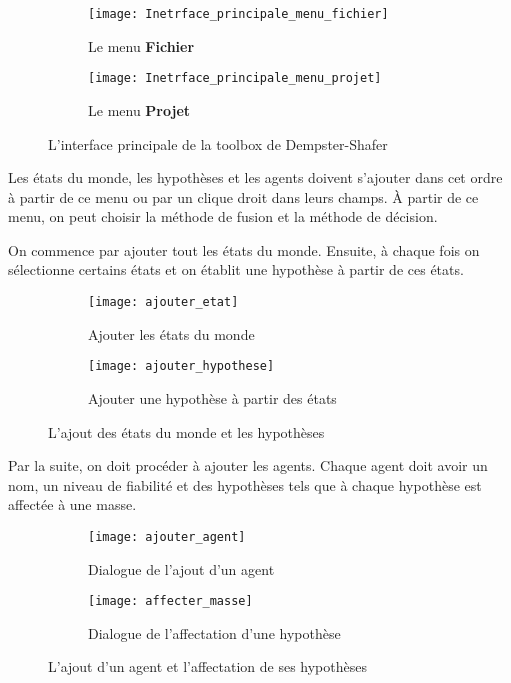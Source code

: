 \begin{figure}[H]
\begin{subfigure}{0.49\textwidth}
\texttt{[image: Inetrface\_principale\_menu\_fichier]}
\caption{Le menu \textbf{Fichier}}
\end{subfigure}
\hfill
\begin{subfigure}{0.49\textwidth}
\texttt{[image: Inetrface\_principale\_menu\_projet]}
\caption{Le menu \textbf{Projet}}
\end{subfigure}
\caption{L'interface principale de la toolbox de Dempster-Shafer}
\end{figure}

Les états du monde, les hypothèses et les agents doivent s'ajouter dans cet ordre à partir
de ce menu ou par un clique droit dans leurs champs. \`A partir de ce menu, on peut choisir la
méthode de fusion et la méthode de décision.

On commence par ajouter tout les états du monde. Ensuite, à chaque fois on sélectionne certains
états et on établit une hypothèse à partir de ces états.

\begin{figure}[H]
\begin{subfigure}{0.49\textwidth}
\texttt{[image: ajouter\_etat]}
\caption{Ajouter les états du monde}
\end{subfigure}
\hfill
\begin{subfigure}{0.49\textwidth}
\texttt{[image: ajouter\_hypothese]}
\caption{Ajouter une hypothèse à partir des états}
\end{subfigure}
\caption{L'ajout des états du monde et les hypothèses}
\end{figure}

Par la suite, on doit procéder à ajouter les agents. Chaque agent doit avoir un nom, un niveau de
fiabilité et des hypothèses tels que à chaque hypothèse est affectée à une masse.

\begin{figure}[H]
\begin{subfigure}{0.49\textwidth}
\texttt{[image: ajouter\_agent]}
\caption{Dialogue de l'ajout d'un agent}
\end{subfigure}
\hfill
\begin{subfigure}{0.49\textwidth}
\texttt{[image: affecter\_masse]}
\caption{Dialogue de l'affectation d'une hypothèse}
\end{subfigure}
\caption{L'ajout d'un agent et l'affectation de ses hypothèses}
\end{figure}

